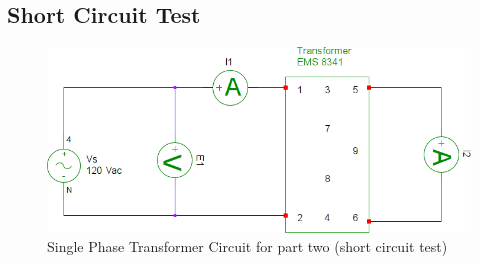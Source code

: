 \documentclass{article}
\begin{document}
\subsection*{Short Circuit Test}
\begin{figure}[H]
  \centering
  \includegraphics[width=.8\textwidth]{img/circuit_03}
  \caption{Single Phase Transformer Circuit for part two (short circuit test)}
  \label{fig:circuit_03}
\end{figure}
\end{document}
